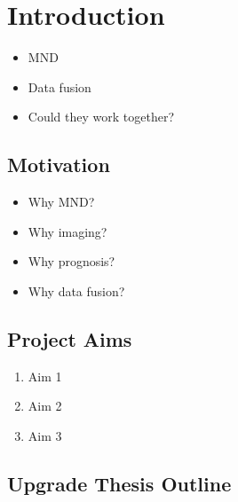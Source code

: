 \chapter{Introduction}
\label{introduction}

\begin{itemize}
    \item MND
    \item Data fusion
    \item Could they work together?
\end{itemize}

\section{Motivation}

\begin{itemize}
    \item Why MND?
    \item Why imaging?
    \item Why prognosis?
    \item Why data fusion?
\end{itemize}

\section{Project Aims}

\begin{enumerate}
    \item Aim 1
    \item Aim 2
    \item Aim 3
\end{enumerate}

\section{Upgrade Thesis Outline}